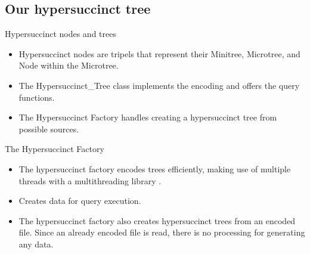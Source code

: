 \documentclass{beamer}
\begin{document}
\subsection{Our hypersuccinct tree}

\begin{frame}{Hypersuccinct nodes and trees}
	\begin{itemize}
	\item
		Hypersuccinct nodes are tripels that represent their Minitree, Microtree, and Node within the Microtree.
	\item
		The Hypersuccinct\_Tree class implements the encoding and offers the query functions.
	\item
		The Hypersuccinct Factory handles creating a hypersuccinct tree from possible sources.
	\end{itemize}
\end{frame}

\begin{frame}{The Hypersuccinct Factory}
	\begin{itemize}
	\item
		The hypersuccinct factory encodes trees efficiently, making use of multiple threads with a multithreading library \cite{threading}.
	\item
		Creates data for query execution.
	\item
		The hypersuccinct factory also creates hypersuccinct trees from an encoded file. Since an already encoded file is read, there is no processing for generating any data.
	\end{itemize}
\end{frame}
\end{document}

